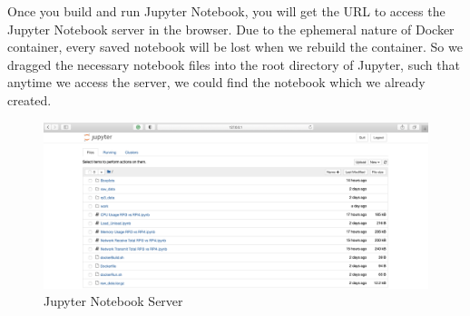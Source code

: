 Once you build and run Jupyter Notebook, you will get the URL to access the Jupyter Notebook server in the browser. Due to the ephemeral nature of Docker container, every saved notebook will be lost when we rebuild the container. So we dragged the necessary notebook files into the root directory of Jupyter, such that anytime we access the server, we could find the notebook which we already created.

\begin{figure}[H]
	\centering
	\includegraphics[width=\textwidth]{images/JupyterNotebookServer.png}
	\caption{Jupyter Notebook Server}
	\label{fig:Jupyter Notebook Server}
\end{figure}